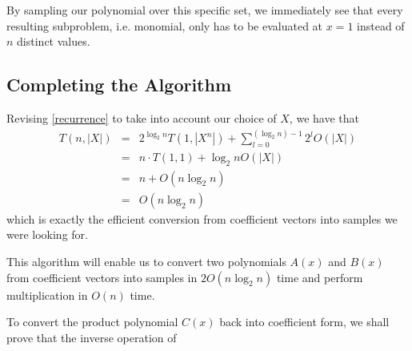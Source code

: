 \documentclass[12pt]{article}
\begin{document}
By sampling our polynomial over this specific set, we immediately see that every resulting subproblem, i.e. monomial, only has to be evaluated at $x=1$ instead of $n$ distinct values.

\subsection{Completing the Algorithm}

Revising \eqref{recurrence} to take into account our choice of $X$, we have that
\begin{eqnarray*}
T(n, |X|) &=& 2^{\log_2{n}}T(1,|X^n|)+\sum_{l=0}^{(\log_2{n})-1}2^lO(|X|)\\
&=& n\cdot T(1,1) + \log_2{n}O(|X|)\\
&=& n+O(n\log_2{n})\\
&=& O(n\log_2{n})
\end{eqnarray*}
which is exactly the efficient conversion from coefficient vectors into samples we were looking for.

This algorithm will enable us to convert two polynomials $A(x)$ and $B(x)$ from coefficient vectors into samples in $2O(n\log_2{n})$ time and perform multiplication in $O(n)$ time.

To convert the product polynomial $C(x)$ back into coefficient form, we shall prove that the inverse operation of 
\end{document}
